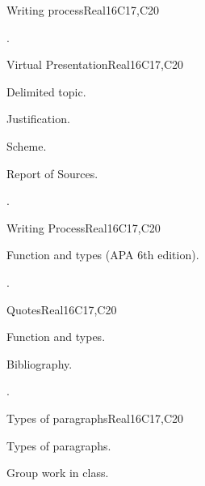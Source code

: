 \begin{syllabus}
\begin{unit}{Writing process}{}{Real}{16}{C17,C20}
  \begin{learningoutcomes}
   \item .%
  \end{learningoutcomes}
\end{unit}

\begin{unit}{Virtual Presentation}{}{Real}{16}{C17,C20}
  \begin{topics}
      \item Delimited topic.
      \item Justification.
      \item Scheme.
      \item Report of Sources.
  \end{topics}

  \begin{learningoutcomes}
   \item .%
  \end{learningoutcomes}
\end{unit}

\begin{unit}{Writing Process}{}{Real}{16}{C17,C20}
  \begin{topics}
      \item Function and types (APA 6th edition).
  \end{topics}

  \begin{learningoutcomes}
   \item .%
  \end{learningoutcomes}
\end{unit}


\begin{unit}{Quotes}{}{Real}{16}{C17,C20}
  \begin{topics}
      \item Function and types.
      \item Bibliography.
  \end{topics}

  \begin{learningoutcomes}
   \item .%
  \end{learningoutcomes}
\end{unit}

\begin{unit}{Types of paragraphs}{}{Real}{16}{C17,C20}
  \begin{topics}
      \item Types of paragraphs.
      \item Group work in class.
  \end{topics}


\end{unit}
\end{syllabus}
